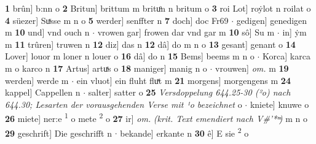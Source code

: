 \documentclass[8pt,a4paper,notitlepage]{article}
\begin{document}
\begin{table}[ht]
\begin{minipage}[t]{0.5\linewidth}
\textbf{1} brûn] b:nn o \textbf{2} Britun] brittum m brituͦn n britum o \textbf{3} roi Lot] roẏlot n roilat o \textbf{4} süezer] Suͯsse m n o \textbf{5} werder] senffter n \textbf{7} doch] doc Fr69  $\cdot$ gedigen] genedigen m \textbf{10} und] vnd ouch n  $\cdot$ vrowen gar] frowen dar vnd gar m \textbf{10} sô] Su m  $\cdot$ in] ẏm m \textbf{11} trûren] truwen n \textbf{12} diz] das n \textbf{12} dâ] do m n o \textbf{13} gesant] genant o \textbf{14} Lover] louor m loner n louer o \textbf{16} dâ] do n \textbf{15} Bems] beems m n o  $\cdot$ Korca] karca m o karco n \textbf{17} Artus] artuͯs o \textbf{18} maniger] manig n o  $\cdot$ vrouwen] \textit{om.} m \textbf{19} werden] werde m  $\cdot$ ein vluot] ein fluht fluͯt m \textbf{21} morgens] morgengens m \textbf{24} kappel] Cappellen n  $\cdot$ salter] satter o \textbf{25} \textit{Versdoppelung 644.25-30 (²o) nach 644.30; Lesarten der vorausgehenden Verse mit ¹o bezeichnet} o   $\cdot$ kniete] knuwe o \textbf{26} miete] ner:e \textsuperscript{1}\hspace{-1.3mm} o mete \textsuperscript{2}\hspace{-1.3mm} o \textbf{27} ir] \textit{om.} \textit{(krit. Text emendiert nach V#'* ͫ)} m n o \textbf{29} geschrift] Die geschrifft n  $\cdot$ bekande] erkante n \textbf{30} ê] E sie \textsuperscript{2}\hspace{-1.3mm} o \newline
\end{minipage}
\end{table}
\newpage
\end{document}
